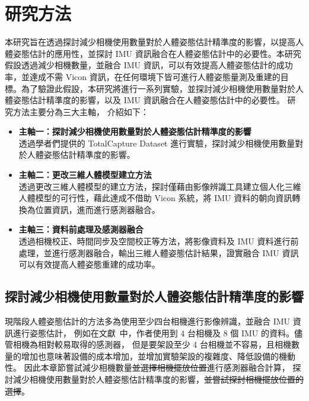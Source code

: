 \chapter{研究方法}
\fontsize{12pt}{18pt}\selectfont

本研究旨在透過探討減少相機使用數量對於人體姿態估計精準度的影響，以提高人體姿態估計的應用性，並探討 IMU 資訊融合在人體姿態估計中的必要性。本研究假設透過減少相機數量，並融合 IMU 資訊，可以有效提高人體姿態估計的成功率，並達成不需 Vicon 資訊，在任何環境下皆可進行人體姿態量測及重建的目標。為了驗證此假設，本研究將進行一系列實驗，並探討減少相機使用數量對於人體姿態估計精準度的影響，以及 IMU 資訊融合在人體姿態估計中的必要性。
研究方法主要分為三大主軸，
介紹如下：
\begin{itemize}
    \item \textbf{主軸一：探討減少相機使用數量對於人體姿態估計精準度的影響}
    \\ 透過學者們提供的 TotalCapture Dataset 進行實驗，探討減少相機使用數量對於人體姿態估計精準度的影響。
    \item \textbf{主軸二：更改三維人體模型建立方法}
    \\ 透過更改三維人體模型的建立方法，探討僅藉由影像辨識工具建立個人化三維人體模型的可行性，藉此達成不借助 Vicon 系統，將 IMU 資料的朝向資訊轉換為位置資訊，進而進行感測器融合。
    \item \textbf{主軸三：資料前處理及感測器融合}
    \\ 透過相機校正、時間同步及空間校正等方法，將影像資料及 IMU 資料進行前處理，並進行感測器融合，輸出三維人體姿態估計結果，證實融合 IMU 資訊可以有效提高人體姿態重建的成功率。
\end{itemize}


\clearpage

\section{探討減少相機使用數量對於人體姿態估計精準度的影響}
現階段人體姿態估計的方法多為使用至少四台相機進行影像辨識，並融合 IMU 資訊進行姿態估計，
例如在文獻~\cite{Zhang_2020_CVPR}中，作者使用到 4 台相機及 8 個 IMU 的資料。儘管相機為相對較易取得的感測器，
但是要架設至少 4 台相機並不容易，且相機數量的增加也意味著設備的成本增加，並增加實驗架設的複雜度、降低設備的機動性。
因此本章節嘗試減少相機數量\sout{並選擇相機擺放位置}進行感測器融合計算，
探討減少相機使用數量對於人體姿態估計精準度的影響，\sout{並嘗試探討相機擺放位置的選擇}。

